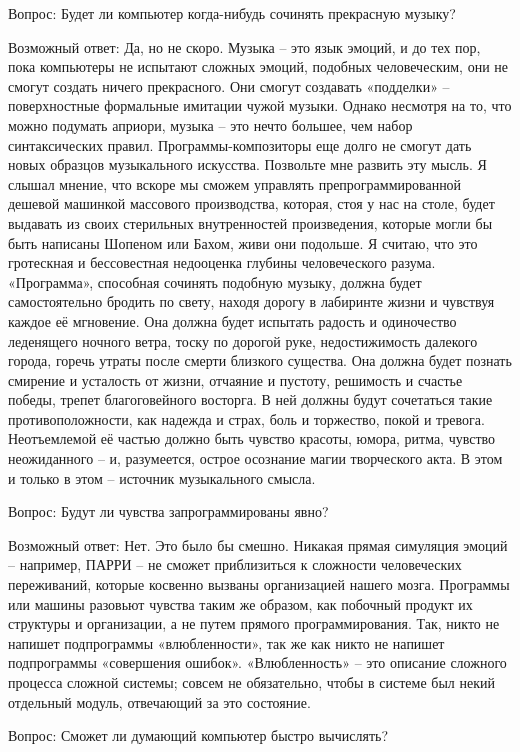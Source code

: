 \documentclass[../main.tex]{subfiles}
\begin{document}
Вопрос: Будет ли компьютер когда-нибудь сочинять прекрасную музыку?

Возможный ответ: Да, но не скоро. Музыка \--- это язык эмоций, и до тех пор, пока компьютеры не испытают сложных эмоций, подобных человеческим, они не смогут создать ничего прекрасного. Они смогут создавать «подделки» \--- поверхностные формальные имитации чужой музыки. Однако несмотря на то, что можно подумать априори, музыка \--- это нечто большее, чем набор синтаксических правил. Программы-композиторы еще долго не смогут дать новых образцов музыкального искусства. Позвольте мне развить эту мысль. Я слышал мнение, что вскоре мы сможем управлять препрограммированной дешевой машинкой массового производства, которая, стоя у нас на столе, будет выдавать из своих стерильных внутренностей произведения, которые могли бы быть написаны Шопеном или Бахом, живи они подольше. Я считаю, что это гротескная и бессовестная недооценка глубины человеческого разума. «Программа», способная сочинять подобную музыку, должна будет самостоятельно бродить по свету, находя дорогу в лабиринте жизни и чувствуя каждое её мгновение. Она должна будет испытать радость и одиночество леденящего ночного ветра, тоску по дорогой руке, недостижимость далекого города, горечь утраты после смерти близкого существа. Она должна будет познать смирение и усталость от жизни, отчаяние и пустоту, решимость и счастье победы, трепет благоговейного восторга. В ней должны будут сочетаться такие противоположности, как надежда и страх, боль и торжество, покой и тревога. Неотъемлемой её частью должно быть чувство красоты, юмора, ритма, чувство неожиданного \--- и, разумеется, острое осознание магии творческого акта. В этом и только в этом \--- источник музыкального смысла.

Вопрос: Будут ли чувства запрограммированы явно?

Возможный ответ: Нет. Это было бы смешно. Никакая прямая симуляция эмоций \--- например, ПАРРИ \--- не сможет приблизиться к сложности человеческих переживаний, которые косвенно вызваны организацией нашего мозга. Программы или машины разовьют чувства таким же образом, как побочный продукт их структуры и организации, а не путем прямого программирования. Так, никто не напишет подпрограммы «влюбленности», так же как никто не напишет подпрограммы «совершения ошибок». «Влюбленность» \--- это описание сложного процесса сложной системы; совсем не обязательно, чтобы в системе был некий отдельный модуль, отвечающий за это состояние.

Вопрос: Сможет ли думающий компьютер быстро вычислять?
\end{document}
